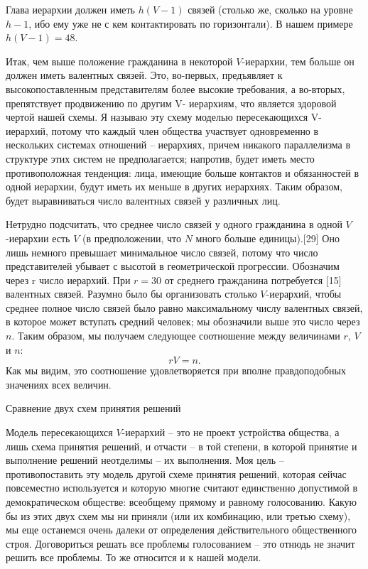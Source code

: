 \documentclass{book}
\begin{document}
Глава иерархии должен иметь $h(V-1)$  связей (столько же, сколько на уровне $h - 1$, ибо ему уже не с кем контактировать по горизонтали). В нашем примере $h (V - 1) = 48$.

Итак, чем выше положение гражданина в некоторой $V$-иерар­хии, тем больше он должен иметь валентных связей. Это, во-первых, предъявляет к высокопоставленным представителям более высокие требования, а во-вторых, препятствует продви­жению по другим V-  иерархиям, что является здоровой чертой нашей схемы. Я называю эту схему моделью пересекающихся V-  иерархий, потому что каждый член общества участвует од­новременно в нескольких системах отношений -- иерархиях, причем никакого параллелизма в структуре этих систем не предполагается; напротив, будет иметь место противоположная тенденция: лица, имеющие больше контактов и обязанностей в одной иерархии, будут иметь их меньше в других иерархиях. Таким образом, будет выравниваться число валентных связей у различных лиц.

Нетрудно подсчитать, что среднее число связей у одного гражданина в одной $V$-иерархии есть $V$ (в предположении, что $N$ много больше единицы).[29] Оно лишь немного превышает мини­мальное число связей, потому что число представителей убывает с высотой в геометрической прогрессии. Обозначим через r  число иерархий. При $r= 30$  от среднего гражданина потребуется [15] валент­ных связей. Разумно было бы организовать столько $V$-иерар­хий, чтобы среднее полное число связей было равно максималь­ному числу валентных связей, в которое может вступать средний человек; мы обозначили выше это число через $n$.  Таким обра­зом, мы получаем следующее соотношение между величинами $r$, $V$ и $n$: 
\[
	rV=n.
\]
Как мы видим, это соотношение удовлетворяется при вполне правдоподобных значениях всех величин.

Сравнение двух схем принятия решений

Модель пересекающихся $V$-иерархий -- это не проект устройст­ва общества, а лишь схема принятия решений, и отчасти -- в той степени, в которой принятие и выполнение решений неотделимы -- их выполнения. Моя цель -- противопоставить эту мо­дель другой схеме принятия решений, которая сейчас повсеместно используется и которую многие считают единственно допустимой в демократическом обществе: всеобщему прямому и равному голосованию. Какую бы из этих двух схем мы ни приняли (или их комбинацию, или третью схему), мы еще останемся очень далеки от определения действительного общественного строя. Договориться решать все проблемы голосованием -- это отнюдь не значит решить все проблемы. То же относится и к нашей мо­дели.
\end{document}
